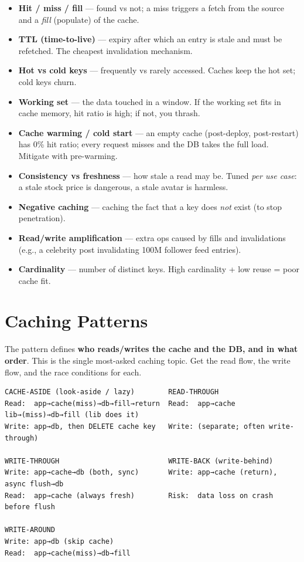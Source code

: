 \documentclass[11pt]{article}
\providecommand{\tightlist}{\setlength{\itemsep}{1pt}\setlength{\parskip}{0pt}}
\begin{document}
\begin{itemize}
\tightlist
\item
  \textbf{Hit / miss / fill} --- found vs not; a miss triggers a fetch from the source and a \emph{fill} (populate) of the cache.
\item
  \textbf{TTL (time-to-live)} --- expiry after which an entry is stale and must be refetched. The cheapest invalidation mechanism.
\item
  \textbf{Hot vs cold keys} --- frequently vs rarely accessed. Caches keep the hot set; cold keys churn.
\item
  \textbf{Working set} --- the data touched in a window. If the working set fits in cache memory, hit ratio is high; if not, you thrash.
\item
  \textbf{Cache warming / cold start} --- an empty cache (post-deploy, post-restart) has 0\% hit ratio; every request misses and the DB takes the full load. Mitigate with pre-warming.
\item
  \textbf{Consistency vs freshness} --- how stale a read may be. Tuned \emph{per use case}: a stale stock price is dangerous, a stale avatar is harmless.
\item
  \textbf{Negative caching} --- caching the fact that a key does \emph{not} exist (to stop penetration).
\item
  \textbf{Read/write amplification} --- extra ops caused by fills and invalidations (e.g., a celebrity post invalidating 100M follower feed entries).
\item
  \textbf{Cardinality} --- number of distinct keys. High cardinality + low reuse = poor cache fit.
\end{itemize}

\section{Caching Patterns}\label{caching-patterns}

The pattern defines \textbf{who reads/writes the cache and the DB, and in what order}. This is the single most-asked caching topic. Get the read flow, the write flow, and the race conditions for each.

\setcodelang{}

\begin{verbatim}
CACHE-ASIDE (look-aside / lazy)        READ-THROUGH
Read:  app→cache(miss)→db→fill→return  Read:  app→cache lib→(miss)→db→fill (lib does it)
Write: app→db, then DELETE cache key   Write: (separate; often write-through)

WRITE-THROUGH                          WRITE-BACK (write-behind)
Write: app→cache→db (both, sync)       Write: app→cache (return), async flush→db
Read:  app→cache (always fresh)        Risk:  data loss on crash before flush

WRITE-AROUND
Write: app→db (skip cache)
Read:  app→cache(miss)→db→fill
\end{verbatim}
\end{document}
